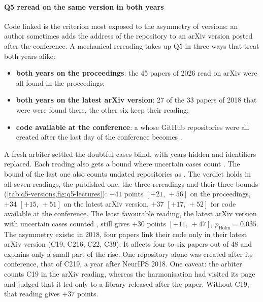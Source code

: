 \paragraph{Q5 reread on the same version in both years}
Code linked is the criterion most exposed to the asymmetry of versions: an author sometimes adds the address
of the repository to an arXiv version posted after the conference. A mechanical rereading
takes up Q5 in three ways that treat both years alike:
\begin{itemize}
  \item \textbf{both years on the proceedings}: the 45 papers of 2026 read on arXiv were all found in the
  proceedings;
  \item \textbf{both years on the latest arXiv version}: 27 of the 33 papers of 2018 that were 
  were found there, the other six keep their reading;
  \item \textbf{code available at the conference}: a  whose GitHub repositories were all created
  after the last day of the conference becomes .
\end{itemize}
A fresh arbiter settled the doubtful cases blind, with years hidden and identifiers replaced. Each reading also
gets a bound where uncertain cases count . The bound of the last one also counts undated
repositories as . The verdict holds in all seven readings, the published one, the three rereadings and their three
bounds (\cref{tab:q5-versions,fig:q5-lectures}):
$+41$ points $[+21,\,+56]$ on the proceedings, $+34$ $[+15,\,+51]$ on the latest arXiv version, $+37$
$[+17,\,+52]$ for code available at the conference. The least favourable reading, the latest arXiv version with
uncertain cases counted , still gives $+30$ points $[+11,\,+47]$, $p_{\text{Holm}} = 0.035$. The
asymmetry exists: in 2018, four papers link their code only in their latest arXiv version (C19, C216, C22,
C39). It affects four to six papers out of 48 and explains only a small part of the rise. One repository
alone was created after its conference, that of C219, a year after NeurIPS 2018. One caveat: the arbiter
counts C19  in the arXiv reading, whereas the harmonisation had visited its page and judged that it led
only to a library released after the paper. Without C19, that reading gives $+37$ points.



